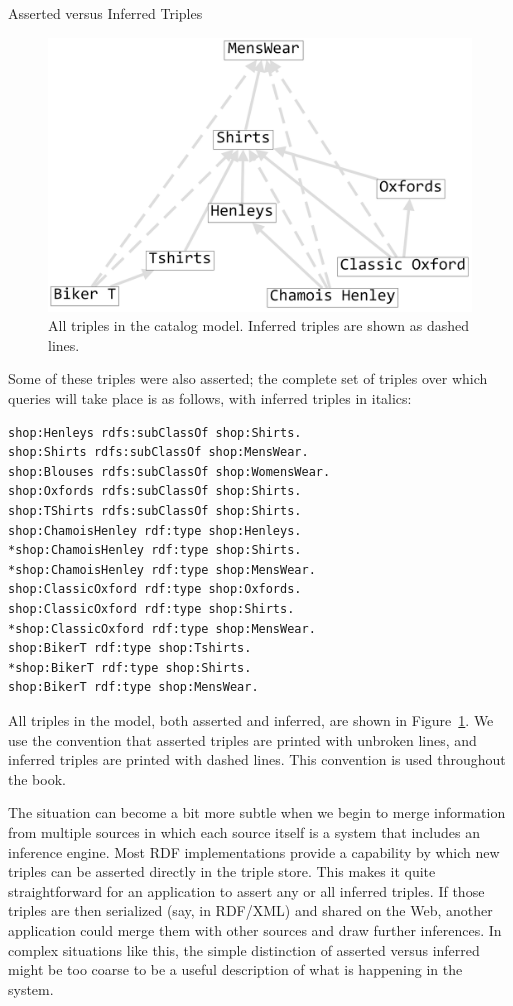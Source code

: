 \begin{example}{Asserted versus Inferred Triples}
\begin{figure}
\centering
\includegraphics[width=5in]{SWWOv3/media/ch7/figure7-3.png}
\caption{All triples in the catalog model. Inferred triples are shown as dashed
lines.}
\label{fig:ch7.3}
\end{figure}



Some of these triples were also asserted; the complete set of triples
over which queries will take place is as follows, with inferred triples
in italics:

\begin{lstlisting}
shop:Henleys rdfs:subClassOf shop:Shirts.
shop:Shirts rdfs:subClassOf shop:MensWear.
shop:Blouses rdfs:subClassOf shop:WomensWear.
shop:Oxfords rdfs:subClassOf shop:Shirts.
shop:TShirts rdfs:subClassOf shop:Shirts.
shop:ChamoisHenley rdf:type shop:Henleys.
*shop:ChamoisHenley rdf:type shop:Shirts.
*shop:ChamoisHenley rdf:type shop:MensWear.
shop:ClassicOxford rdf:type shop:Oxfords.
shop:ClassicOxford rdf:type shop:Shirts.
*shop:ClassicOxford rdf:type shop:MensWear.
shop:BikerT rdf:type shop:Tshirts.
*shop:BikerT rdf:type shop:Shirts.
shop:BikerT rdf:type shop:MensWear.
\end{lstlisting}


All triples in the model, both asserted and inferred, are shown in
Figure~\ref{fig:ch7.3}. We use the convention that asserted triples are printed with
unbroken lines, and inferred triples are printed with dashed lines. This
convention is used throughout the book.
\end{example}

The situation can become a bit more subtle when we begin to merge
information from multiple sources in which each source itself is a
system that includes an inference engine. Most RDF implementations
provide a capability by which new triples can be asserted directly in
the triple store. This makes it quite straightforward for an application
to assert any or all inferred triples. If those triples are then
serialized (say, in RDF/XML) and shared on the Web, another application
could merge them with other sources and draw further inferences. In
complex situations like this, the simple distinction of asserted versus
inferred might be too coarse to be a useful description of what is
happening in the system.

